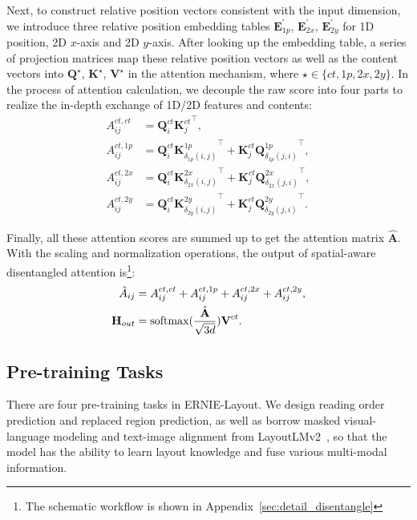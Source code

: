 \documentclass[11pt]{article}
\begin{document}
Next, to construct relative position vectors consistent with the input dimension, we introduce three relative position embedding tables $\textbf{E}_{1p}^{'}$, $\textbf{E}_{2x}^{'}$, $\textbf{E}_{2y}^{'}$ for 1D position, 2D $x$-axis and 2D $y$-axis.
After looking up the embedding table, a series of projection matrices map these relative position vectors as well as the content vectors into $\textbf{Q}^{\star}$, $\textbf{K}^{\star}$, $\textbf{V}^{\star}$ in the attention mechanism, where $\star \in \{{ct, 1p, 2x, 2y}\}$.
In the process of attention calculation, we decouple the raw score into four parts to realize the in-depth exchange of 1D/2D features and contents:
\begin{align}
    {A}_{ij}^{ct,ct} &= \textbf{Q}^{ct}_{i} {\textbf{K}^{ct}_{j}}^{\top}, \\
    {A}_{ij}^{ct,1p} &= \textbf{Q}^{ct}_{i}{\textbf{K}^{1p}_{\delta_{1p}(i,j)}}^{\top} + \textbf{K}^{ct}_{j}{\textbf{Q}^{1p}_{\delta_{1p}(j,i)}}^{\top}, \\
    {A}_{ij}^{ct,2x} &= \textbf{Q}^{ct}_{i}{\textbf{K}^{2x}_{\delta_{2x}(i,j)}}^{\top} + \textbf{K}^{ct}_{j}{\textbf{Q}^{2x}_{\delta_{2x}(j,i)}}^{\top}, \\
    {A}_{ij}^{ct,2y} &= \textbf{Q}^{ct}_{i}{\textbf{K}^{2y}_{\delta_{2y}(i,j)}}^{\top} + \textbf{K}^{ct}_{j}{\textbf{Q}^{2y}_{\delta_{2y}(j,i)}}^{\top}.
\end{align}

Finally, all these attention scores are summed up to get the attention matrix $\hat{\textbf{A}}$. With the scaling and normalization operations, the output of spatial-aware disentangled attention is\footnote{The schematic workflow is shown in
Appendix~\ref{sec:detail_disentangle}}:
\begin{align}
    \hat{A}_{ij} &= {A}_{ij}^{ct,ct} + {A}_{ij}^{ct,1p} + {A}_{ij}^{ct,2x} + {A}_{ij}^{ct,2y}, \\
    \textbf{H}_{out} &= {\rm softmax}(\frac{\hat{\textbf{A}}}{\sqrt{3d}}) \textbf{V}^{ct}.
\end{align}

\subsection{Pre-training Tasks}

There are four pre-training tasks in ERNIE-Layout.
We design reading order prediction and replaced region prediction, as well as borrow masked visual-language modeling and text-image alignment from LayoutLMv2~\cite{xu2021layoutlmv2}, so that the model has the ability to learn layout knowledge and fuse various multi-modal information.
\end{document}
